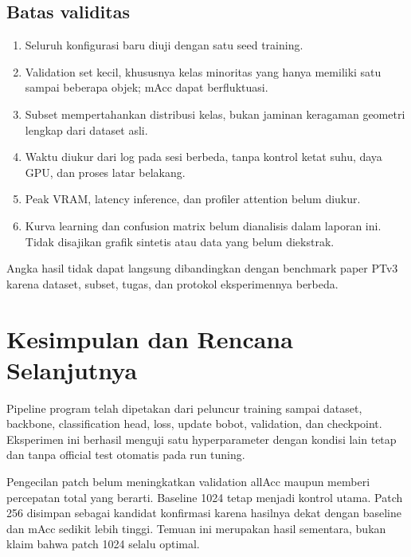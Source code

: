\documentclass[11pt,a4paper]{article}
\begin{document}
\subsection{Batas validitas}
\begin{enumerate}
\item Seluruh konfigurasi baru diuji dengan satu seed training.
\item Validation set kecil, khususnya kelas minoritas yang hanya memiliki
      satu sampai beberapa objek; mAcc dapat berfluktuasi.
\item Subset mempertahankan distribusi kelas, bukan jaminan keragaman
      geometri lengkap dari dataset asli.
\item Waktu diukur dari log pada sesi berbeda, tanpa kontrol ketat suhu,
      daya GPU, dan proses latar belakang.
\item Peak VRAM, latency inference, dan profiler attention belum diukur.
\item Kurva learning dan confusion matrix belum dianalisis dalam laporan
      ini. Tidak disajikan grafik sintetis atau data yang belum diekstrak.
\end{enumerate}
Angka hasil tidak dapat langsung dibandingkan dengan benchmark paper PTv3
karena dataset, subset, tugas, dan protokol eksperimennya berbeda.

\section{Kesimpulan dan Rencana Selanjutnya}
Pipeline program telah dipetakan dari peluncur training sampai dataset,
backbone, classification head, loss, update bobot, validation, dan
checkpoint. Eksperimen ini berhasil menguji satu hyperparameter dengan
kondisi lain tetap dan tanpa official test otomatis pada run tuning.

Pengecilan patch belum meningkatkan validation allAcc maupun memberi
percepatan total yang berarti. Baseline 1024 tetap menjadi kontrol utama.
Patch 256 disimpan sebagai kandidat konfirmasi karena hasilnya dekat
dengan baseline dan mAcc sedikit lebih tinggi. Temuan ini merupakan
hasil sementara, bukan klaim bahwa patch 1024 selalu optimal.
\end{document}
